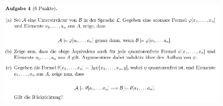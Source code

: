 \documentclass[a4paper]{scrartcl}
\begin{document}
\section*{}%
\label{sec:aufgabe_4}

    \begin{figure}[H]
        \centering
        \includegraphics[scale=0.6]{./A-4.png}
        \label{fig:}
    \end{figure}
\end{document}
